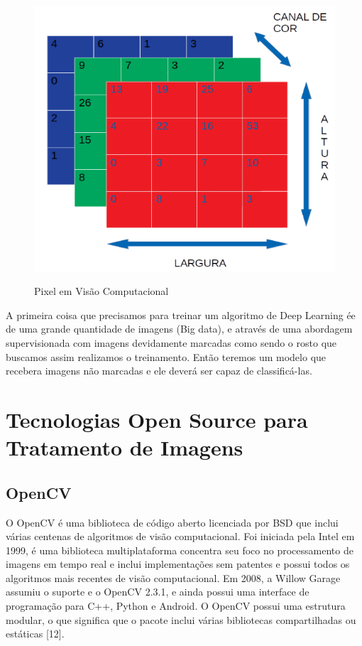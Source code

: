 \begin{figure}[htpb]
  \centering
  \caption{Pixel em Visão Computacional}
  \includegraphics[scale=.9]{figs/pixel.png}
  \label{fig:pixel}
\end{figure}

A primeira coisa que precisamos para treinar um algoritmo de Deep Learning ée de uma grande quantidade de imagens (Big data), e através de uma abordagem supervisionada com imagens devidamente marcadas como sendo o rosto que buscamos assim realizamos o treinamento. Então teremos um modelo que recebera imagens não marcadas e ele deverá ser capaz de classificá-las.
\section{Tecnologias Open Source para Tratamento de Imagens}

\subsection{OpenCV}
O OpenCV é uma biblioteca de código aberto licenciada por BSD que inclui várias centenas de algoritmos de visão computacional.
Foi iniciada pela Intel em 1999, é uma biblioteca multiplataforma concentra seu foco no processamento de imagens em tempo real e inclui implementações sem patentes e possui todos os algoritmos mais recentes de visão computacional. Em 2008, a Willow Garage assumiu o suporte e o OpenCV 2.3.1, e ainda possui uma interface de programação para C++, Python e Android.
O OpenCV possui uma estrutura modular, o que significa que o pacote inclui várias bibliotecas compartilhadas ou estáticas [12].
